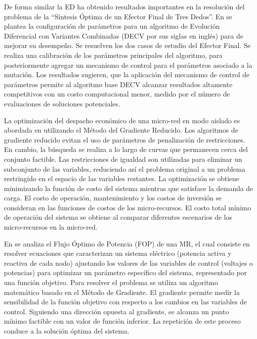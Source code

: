   De forma similar la ED ha obtenido resultados importantes en la resolución del problema de la ``Síntesis Óptima de un Efector Final de Tres Dedos''. En \cite{mezura-montes_dynamic_2015} se plantea la configuración de parámetros para un algoritmo de Evolución Diferencial con Variantes Combinadas (DECV por sus siglas en inglés) para de mejorar su desempeño. Se resuelven los dos casos de estudio del Efector Final. Se realiza una calibración de los parámetros principales del algoritmo, para posteriormente agregar un mecanismo de control para el parámetros asociado a la mutación. Los resultados sugieren, que la aplicación del mecanismo de control de parámetros permite al algoritmo base DECV alcanzar resultados altamente competitivos con un costo computacional menor, medido por el número de evaluaciones de soluciones potenciales.
  
  

  La optimización del despacho económico de una micro-red en modo aislado es abordada en \cite{ramabhotla2014economic} utilizando el Método del Gradiente Reducido.  Los algoritmos de gradiente reducido evitan el uso de parámetros de penalización de restricciones. En cambio, la búsqueda se realiza a lo largo de curvas que permanecen cerca del conjunto factible. Las restricciones de igualdad son utilizadas para eliminar un subconjunto de las variables, reduciendo así el problema original a un problema restringido en el espacio de las variables restantes. La optimización se obtiene minimizando la función de costo del sistema mientras que satisface la demanda de carga. El costo de operación, mantenimiento y los costos de inversión se consideran en las funciones de costos de los micro-recursos.  El costo total mínimo de operación del sistema se obtiene al comparar diferentes escenarios de los micro-recursos en la micro-red. 
  
 
 En \cite{heredia-ramirez_optimal_2014} se analiza el Flujo Óptimo de Potencia (FOP) de una MR, el cual consiste en resolver ecuaciones que caracterizan un sistema eléctrico (potencia activa y reactiva de cada nodo) ajustando los valores de las variables de control (voltajes o potencias) para optimizar un parámetro específico del sistema, representado por una función objetivo. Para resolver el problema se utiliza un algoritmo matemático basado en el Método de Gradiente. El gradiente permite medir la sensibilidad de la función objetivo con respecto a los cambios en las variables de control. Siguiendo una dirección opuesta al gradiente, se alcanza un punto mínimo factible con un valor de función inferior. La repetición de este proceso conduce a la solución óptima del sistema.
 
